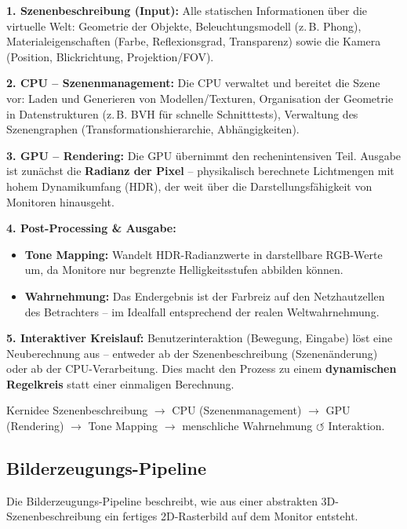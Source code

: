 \documentclass[12pt, a4paper]{article}
\begin{document}
\textbf{1. Szenenbeschreibung (Input):} Alle statischen Informationen über die virtuelle Welt: Geometrie der Objekte, Beleuchtungsmodell (z.\,B. Phong), Materialeigenschaften (Farbe, Reflexionsgrad, Transparenz) sowie die Kamera (Position, Blickrichtung, Projektion/FOV).

\textbf{2. CPU -- Szenenmanagement:} Die CPU verwaltet und bereitet die Szene vor: Laden und Generieren von Modellen/Texturen, Organisation der Geometrie in Datenstrukturen (z.\,B. BVH für schnelle Schnitttests), Verwaltung des Szenengraphen (Transformationshierarchie, Abhängigkeiten).

\textbf{3. GPU -- Rendering:} Die GPU übernimmt den rechenintensiven Teil. Ausgabe ist zunächst die \textbf{Radianz der Pixel} -- physikalisch berechnete Lichtmengen mit hohem Dynamikumfang (HDR), der weit über die Darstellungsfähigkeit von Monitoren hinausgeht.

\textbf{4. Post-Processing \& Ausgabe:}
\begin{itemize}
  \item \textbf{Tone Mapping:} Wandelt HDR-Radianzwerte in darstellbare RGB-Werte um, da Monitore nur begrenzte Helligkeitsstufen abbilden können.
  \item \textbf{Wahrnehmung:} Das Endergebnis ist der Farbreiz auf den Netzhautzellen des Betrachters -- im Idealfall entsprechend der realen Weltwahrnehmung.
\end{itemize}

\textbf{5. Interaktiver Kreislauf:} Benutzerinteraktion (Bewegung, Eingabe) löst eine Neuberechnung aus -- entweder ab der Szenenbeschreibung (Szenenänderung) oder ab der CPU-Verarbeitung. Dies macht den Prozess zu einem \textbf{dynamischen Regelkreis} statt einer einmaligen Berechnung.

\begin{notebox}{Kernidee}
Szenenbeschreibung $\to$ CPU (Szenenmanagement) $\to$ GPU (Rendering) $\to$ Tone Mapping $\to$ menschliche Wahrnehmung $\circlearrowleft$ Interaktion.
\end{notebox}

\subsection{Bilderzeugungs-Pipeline}

Die Bilderzeugungs-Pipeline beschreibt, wie aus einer abstrakten 3D-Szenenbeschreibung ein fertiges 2D-Rasterbild auf dem Monitor entsteht.
\end{document}
